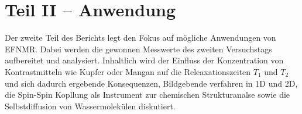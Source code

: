 \section{Teil II -- Anwendung}
\label{sec:Teil2}
Der zweite Teil des Berichts legt den Fokus auf mögliche Anwendungen von EFNMR.
Dabei werden die gewonnen Messwerte des zweiten Versuchstags aufbereitet und analysiert. Inhaltlich wird der Einfluss der Konzentration von Kontrastmitteln wie Kupfer oder Mangan auf die Releaxationszeiten $T_1$ und $T_2$ und sich dadurch ergebende Konsequenzen, Bildgebende verfahren in 1D und 2D, die Spin-Spin Kopllung als Instrument zur chemischen Strukturanalse sowie die Selbstdiffusion von Wassermolekülen diskutiert.






